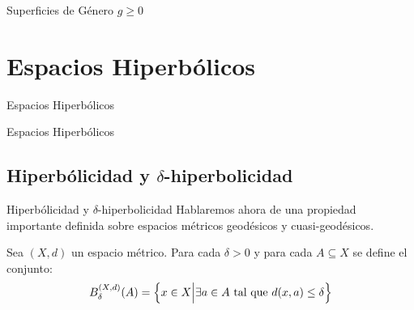\documentclass[xcolor=dvipsnames]{beamer}
\theoremstyle{largebreak}
\begin{document}
\begin{frame}{Superficies de Género $g\geq0$}
    
\end{frame}

\section{Espacios Hiperbólicos}

\begin{frame}{Espacios Hiperbólicos}
    \begin{center}
        \LARGE{Espacios Hiperbólicos}
    \end{center}
\end{frame}

\subsection{Hiperbólicidad y $\delta$-hiperbolicidad}

\begin{frame}{Hiperbólicidad y $\delta$-hiperbolicidad}
    Hablaremos ahora de una propiedad importante definida sobre espacios métricos geodésicos y cuasi-geodésicos.

    \begin{mydef}
        Sea $(X,d)$ un espacio métrico. Para cada $\delta>0$ y para cada $A\subseteq X$ se define el conjunto:
        \begin{equation*}
            B_\delta^{(X,d)}(A)=\left\{x\in X\Big|\exists a\in A\textup{ tal que }d(x,a)\leq\delta \right\}
        \end{equation*}
    \end{mydef}
\end{frame}
\end{document}
